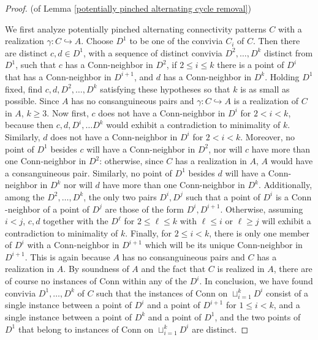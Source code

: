 \documentclass{amsart}
\theoremstyle{definition}
\theoremstyle{remark}
\numberwithin{equation}{section}
\begin{document}
\begin{proof}
     (of Lemma \ref{potentially pinched alternating cycle removal})

We first analyze potentially pinched alternating connectivity patterns $C$ with a realization $\gamma: C \hookrightarrow A$. Choose $D^{1}$ to be one of the convivia $C_{i}$ of $C$. Then there are distinct $c, d \in D^{1}$, with a sequence of distinct convivia $D^{2}, \ldots, D^{k}$ distinct from $D^{1}$, such that $c$ has a $\mathrm{Conn}$-neighbor in $D^{2}$, if $2 \leq i \leq k$ there is a point of $D^{i}$ that has a $\mathrm{Conn}$-neighbor in $D^{i+1}$, and $d$ has a $\mathrm{Conn}$-neighbor in $D^{k}$. Holding $D^{1}$ fixed, find $c, d, D^{2}, \ldots, D^{k}$ satisfying these hypotheses so that $k$ is as small as possible. Since $A$ has no consanguineous pairs and $\gamma: C \hookrightarrow A$ is a realization of $C$ in $A$, $k \geq 3$. Now first, $c$ does not have a $\mathrm{Conn}$-neighbor in $D^{i}$ for $2 < i < k$, because then $c, d, D^{i}, \ldots D^{k}$ would exhibit a contradiction to minimality of $k$. Similarly, $d$ does not have a $\mathrm{Conn}$-neighbor in $D^{i}$ for $2 < i < k$. Moreover, no point of $D^{1}$ besides $c$ will have a $\mathrm{Conn}$-neighbor in $D^{2}$, nor will $c$ have more than one $\mathrm{Conn}$-neighbor in $D^{2}$: otherwise, since $C$ has a realization in $A$, $A$ would have a consanguineous pair. Similarly, no point of $D^{1}$ besides $d$ will have a $\mathrm{Conn}$-neighbor in $D^{k}$ nor will $d$ have more than one $\mathrm{Conn}$-neighbor in $D^{k}$. Additionally, among the $D^{2}, \ldots, D^{k}$, the only two pairs $D^{i}, D^{j}$ such that a point of $D^{i}$ is a $\mathrm{Conn}$-neighbor of a point of $D^{j}$ are those of the form $D^{i}, D^{i+1}$. Otherwise, assuming $i < j$, $c, d$ together with the $D^{\ell}$ for $2 \leq \ell \leq k$ with $\ell \leq i$ or $\ell \geq j$ will exhibit a contradiction to minimality of $k$.  Finally, for $2\leq i <k$, there is only one member of $D^{i}$ with a $\mathrm{Conn}$-neighbor in $D^{i+1}$ which will be its unique $\mathrm{Conn}$-neighbor in $D^{i+1}$. This is again because $A$ has no consanguineous pairs and $C$ has a realization in $A$. By soundness of $A$ and the fact that $C$ is realized in $A$, there are of course no instances of $\mathrm{Conn}$ within any of the $D^{i}$. In conclusion, we have found convivia $D^{1}, \ldots, D^{k}$ of $C$ such that the instances of $\mathrm{Conn}$ on $\sqcup^{k}_{i =1} D^{i}$ consist of a single instance between a point of $D^{i}$ and a point of $D^{i+1}$ for $1 \leq i < k$, and a single instance between a point of $D^{k}$ and a point of $D^{1}$, and the two points of $D^{1}$ that belong to instances of $\mathrm{Conn}$ on $\sqcup^{k}_{i =1} D^{i}$ are distinct.



\end{proof}
\end{document}

